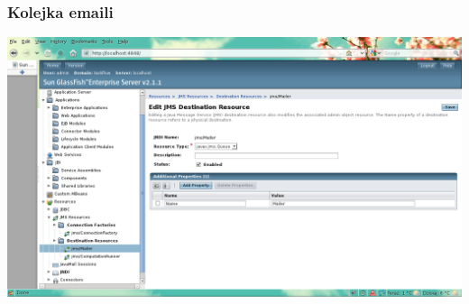 \documentclass{article}
\begin{document}
\subsubsection{Kolejka emaili}
\newline
\newline
\includegraphics[scale=0.4]{img/admin03.png}
\newline
\newline
\end{document}
